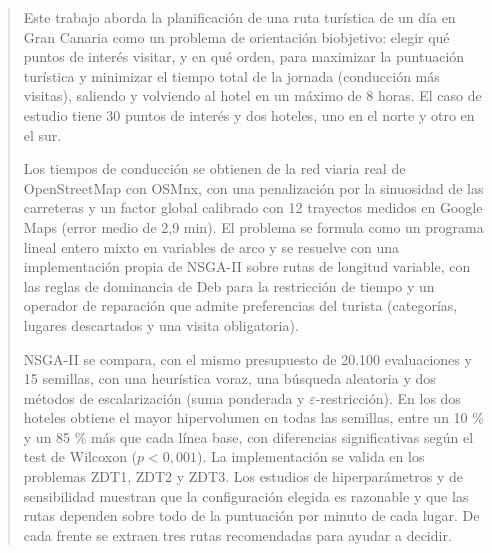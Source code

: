 \begin{abstract}
\noindent
Este trabajo aborda la planificación de una ruta turística de un día en Gran Canaria como un problema de orientación biobjetivo: elegir qué puntos de interés visitar, y en qué orden, para maximizar la puntuación turística y minimizar el tiempo total de la jornada (conducción más visitas), saliendo y volviendo al hotel en un máximo de 8 horas. El caso de estudio tiene 30 puntos de interés y dos hoteles, uno en el norte y otro en el sur.

Los tiempos de conducción se obtienen de la red viaria real de OpenStreetMap con OSMnx, con una penalización por la sinuosidad de las carreteras y un factor global calibrado con 12 trayectos medidos en Google Maps (error medio de 2,9 min). El problema se formula como un programa lineal entero mixto en variables de arco y se resuelve con una implementación propia de NSGA-II sobre rutas de longitud variable, con las reglas de dominancia de Deb para la restricción de tiempo y un operador de reparación que admite preferencias del turista (categorías, lugares descartados y una visita obligatoria).

NSGA-II se compara, con el mismo presupuesto de 20.100 evaluaciones y 15 semillas, con una heurística voraz, una búsqueda aleatoria y dos métodos de escalarización (suma ponderada y $\varepsilon$-restricción). En los dos hoteles obtiene el mayor hipervolumen en todas las semillas, entre un 10 \% y un 85 \% más que cada línea base, con diferencias significativas según el test de Wilcoxon ($p < 0{,}001$). La implementación se valida en los problemas ZDT1, ZDT2 y ZDT3. Los estudios de hiperparámetros y de sensibilidad muestran que la configuración elegida es razonable y que las rutas dependen sobre todo de la puntuación por minuto de cada lugar. De cada frente se extraen tres rutas recomendadas para ayudar a decidir.
\end{abstract}
